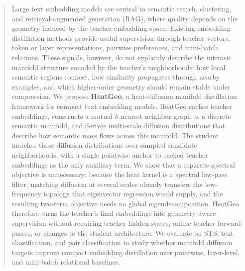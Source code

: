 \begin{abstract}

Large text embedding models are central to semantic search, clustering, and retrieval-augmented generation (RAG), where quality depends on the geometry induced by the teacher embedding space. Existing embedding distillation methods provide useful supervision through teacher vectors, token or layer representations, pairwise preferences, and mini-batch relations. These signals, however, do not explicitly describe the intrinsic manifold structure encoded by the teacher's neighborhoods: how local semantic regions connect, how similarity propagates through nearby examples, and which higher-order geometry should remain stable under compression. We propose \textbf{HeatGeo}, a heat-diffusion manifold distillation framework for compact text embedding models. HeatGeo caches teacher embeddings, constructs a mutual $k$-nearest-neighbor graph as a discrete semantic manifold, and derives multi-scale diffusion distributions that describe how semantic mass flows across this manifold. The student matches these diffusion distributions over sampled candidate neighborhoods, with a single pointwise anchor to cached teacher embeddings as the only auxiliary term. We show that a separate spectral objective is unnecessary: because the heat kernel is a spectral low-pass filter, matching diffusion at several scales already transfers the low-frequency topology that eigenvector regression would supply, and the resulting two-term objective needs no global eigendecomposition. HeatGeo therefore turns the teacher's final embeddings into geometry-aware supervision without requiring teacher hidden states, online teacher forward passes, or changes to the student architecture. We evaluate on STS, text classification, and pair classification to study whether manifold diffusion targets improve compact embedding distillation over pointwise, layer-level, and mini-batch relational baselines.

\end{abstract}
